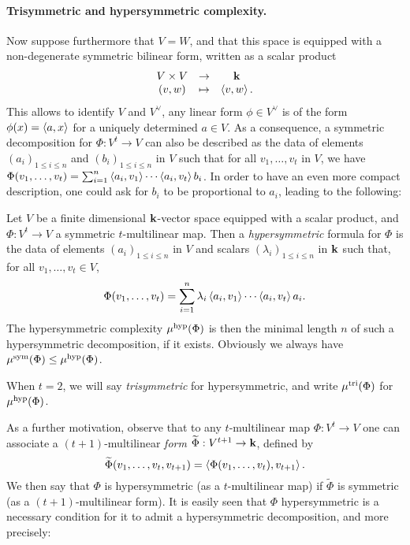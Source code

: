 \documentclass[11pt]{article}
\begin{document}
\paragraph{Trisymmetric and hypersymmetric complexity.}
Now suppose furthermore that $V=W$, and that this space is equipped with a
non-degenerate symmetric bilinear form, written as a scalar product
\[
\begin{array}{ccc}
V\times V &\to&\mathbf{k}\\
(v,w)&\mapsto&\left\langle v,w\right\rangle.
\end{array}
\]
This allows to identify $V$ and $V^\vee$, \ie any linear form $\phi\in V^\vee$
is of the form $\phi(x)=\left\langle a,x\right\rangle$ for a uniquely determined $a\in V$.
As a consequence, a symmetric decomposition for $\Phi:V^t\to V$ can also be described
as the data of elements $(a_i)_{1\leq i\leq n}$ and $(b_i)_{1\leq i\leq n}$ in $V$
such that for all $v_1,\dots,v_t$ in $V$,
we have $\Phi(v_1,\dots,v_t)=\sum_{i=1}^{n}\left\langle a_i,v_1\right\rangle\cdots\left\langle a_i,v_t\right\rangle b_i$.
In order to have an even more compact description, one could ask for $b_i$ to be proportional to $a_i$, leading to the following:
\begin{defi}
Let $V$ be a finite dimensional $\mathbf{k}$-vector space equipped with a scalar product,
and $\Phi:V^t\to V$ a symmetric $t$-multilinear map.
Then a \emph{hypersymmetric} formula for $\Phi$ is the data of
elements $(a_i)_{1\leq i\leq n}$ in $V$ and scalars $(\lambda_i)_{1\leq i\leq n}$ in $\mathbf{k}$ such that, for all $v_1,\dots,v_t\in V$,
\[
\Phi(v_1,\dots,v_t)=\sum_{i=1}^{n}\lambda_i\left\langle a_i,v_1\right\rangle\cdots\left\langle a_i,v_t\right\rangle a_i.
\]
The hypersymmetric complexity $\mu^{\textrm{hyp}}(\Phi)$ is then the minimal length $n$ of such a hypersymmetric decomposition, if it exists. Obviously we always have $\mu^{\textrm{sym}}(\Phi)\leq\mu^{\textrm{hyp}}(\Phi)$.

When $t=2$, we will say \emph{trisymmetric} for hypersymmetric,
and write $\mu^{\textrm{tri}}(\Phi)$ for $\mu^{\textrm{hyp}}(\Phi)$.
\end{defi}
As a further motivation, observe that to any $t$-multilinear map $\Phi:V^t\to V$
one can associate a $(t+1)$-multilinear \emph{form} $\widetilde{\Phi}:V^{t+1}\to \mathbf{k}$, defined by
\[
\widetilde{\Phi}(v_1,\dots,v_t,v_{t+1})=\left\langle\Phi(v_1,\dots,v_t),v_{t+1}\right\rangle.
\]
We then say that $\Phi$ is hypersymmetric (as a $t$-multilinear map)
if $\widetilde{\Phi}$ is symmetric (as a $(t+1)$-multilinear form).
It is easily seen that $\Phi$ hypersymmetric is a necessary condition for it to admit a hypersymmetric decomposition, and more precisely:
\end{document}
